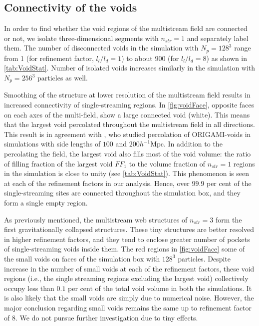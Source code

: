 \subsection{Connectivity of the voids}
\label{sec:voidPerc}




In order to find whether the void regions of the multistream field are connected or not, we isolate three-dimensional segments with $n_{str} = 1$ and separately label them. The number of disconnected voids in the simulation with $N_p = 128^3$ range from 1 (for refinement factor, $l_l/l_d =  1$) to about $900$ (for $l_l/l_d= 8$) as shown in \autoref{tab:VoidStat}. Number of isolated voids increases similarly in the simulation with $N_p = 256^3$ particles as well. 

Smoothing of the structure at lower resolution of the multistream field results in increased connectivity of single-streaming regions. In \autoref{fig:voidFace}, opposite faces on each axes of the multi-field, show a large connected void (white). This means that the largest void percolated throughout the multistream field in all directions. This result is in agreement with \cite{Falck2015}, who studied percolation of ORIGAMI-voids in simulations with side lengths of $100$ and $200  h^{-1} \text{Mpc}$. In addition to the percolating the field, the largest void also fills most of the void volume: the ratio of filling fraction of the largest void $FF_1$ to the volume fraction of $n_{str} = 1$ regions in the simulation is close to unity (see \autoref{tab:VoidStat}). This phenomenon is seen at each of the refinement factors in our analysis. Hence, over $99.9$ per cent of the single-streaming sites are connected throughout the simulation box, and they form a single empty region.  
    

As previously mentioned, the multistream web structures of $n_{str} = 3$ form the first gravitationally collapsed structures. These tiny structures are better resolved in higher refinement factors, and they tend to enclose greater number of pockets of single-streaming voids inside them. The red regions in \autoref{fig:voidFace} some of the small voids on faces of the simulation box with $128^3$ particles. Despite increase in the number of small voids at each of the refinement factors, these void regions (i.e., the single streaming regions excluding the largest void) collectively occupy less than $0.1$ per cent of the total void volume in both the simulations. It is also likely that the small voids are simply due to numerical noise. However, the major conclusion regarding small voids remains the same up to refinement factor of 8. We do not pursue further investigation due to tiny effects.  

